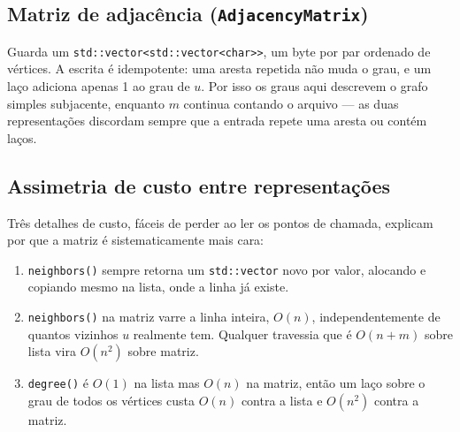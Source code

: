 \documentclass[a4paper,11pt]{article}
\begin{document}
\subsection{Matriz de adjacência (\texttt{AdjacencyMatrix})}

Guarda um \texttt{std::vector<std::vector<char>>}, um byte por par
ordenado de vértices. A escrita é idempotente: uma aresta repetida não
muda o grau, e um laço adiciona apenas 1 ao grau de \(u\). Por isso os
graus aqui descrevem o grafo simples subjacente, enquanto $m$ continua
contando o arquivo --- as duas representações discordam sempre que a
entrada repete uma aresta ou contém laços.

\subsection{Assimetria de custo entre representações}

Três detalhes de custo, fáceis de perder ao ler os pontos de chamada,
explicam por que a matriz é sistematicamente mais cara:

\begin{enumerate}
    \item \texttt{neighbors()} sempre retorna um \texttt{std::vector} novo
    por valor, alocando e copiando mesmo na lista, onde a linha já existe.
    \item \texttt{neighbors()} na matriz varre a linha inteira, $O(n)$,
    independentemente de quantos vizinhos $u$ realmente tem. Qualquer
    travessia que é $O(n+m)$ sobre lista vira $O(n^2)$ sobre matriz.
    \item \texttt{degree()} é $O(1)$ na lista mas $O(n)$ na matriz, então
    um laço sobre o grau de todos os vértices custa $O(n)$ contra a lista
    e $O(n^2)$ contra a matriz.
\end{enumerate}
\end{document}
